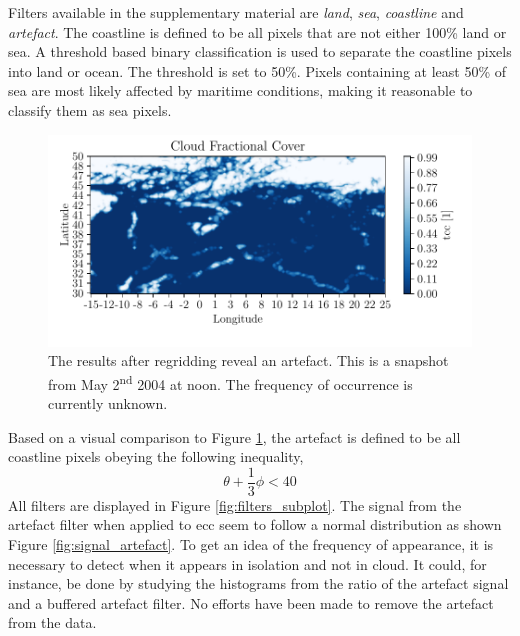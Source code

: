 Filters available in the supplementary material are \textit{land}, \textit{sea}, \textit{coastline} and \textit{artefact}. The coastline is defined to be all pixels that are not either 100\% land or sea. A threshold based binary classification is used to separate the coastline pixels into land or ocean. The threshold is set to 50\%. Pixels containing at least 50\% of sea are most likely affected by maritime conditions, making it reasonable to classify them as sea pixels.
\begin{figure}
    \centering
    \includegraphics{python_figs/example_artefact.pdf}
    \caption[Artefact in European Cloud Cover dataset.]{The results after regridding reveal an artefact. This is a snapshot from May 2\textsuperscript{nd} 2004 at noon. The frequency of occurrence is currently unknown.}
    \label{fig:example_artefact}
\end{figure}
Based on a visual comparison to Figure \ref{fig:example_artefact}, the artefact is defined to be all coastline pixels obeying the following inequality,  %
\begin{equation} \label{eq:artefact_condition}
    \theta + \frac{1}{3}\phi < 40
\end{equation}
All filters are displayed in Figure \ref{fig:filters_subplot}. 
The signal from the artefact filter when applied to \acrshort{ecc} seem to follow a normal distribution as shown Figure \ref{fig:signal_artefact}. To get an idea of the frequency of appearance, it is necessary to detect when it appears in isolation and not in cloud. It could, for instance, be done by studying the histograms from the ratio of the artefact signal and a buffered artefact filter.
No efforts have been made to remove the artefact from the data. %

